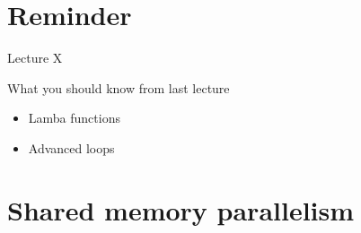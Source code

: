 \documentclass[12pt,t]{beamer}
\title{\coursename}
\subtitle{Lecture 7: Shared memory  parallelism}
\date {
 \tiny \url{\courseurl}
\vspace{2cm}
\doclicenseThis  
  
}
\begin{document}
 {
    \frame {
        \titlepage
    }
}

\frame{

\tableofcontents

}


\section{Reminder}
\begin{frame}{Lecture X}
\begin{block}{What you should know from last lecture}
\begin{itemize}
\item Lamba functions
\item Advanced loops
\end{itemize}
\end{block}
\end{frame}

\section{Shared memory parallelism}
\end{document}
